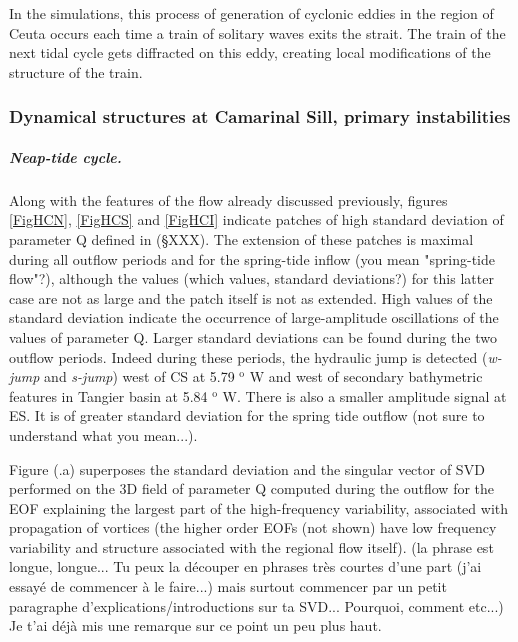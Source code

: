 In the simulations, this process of generation of cyclonic eddies \color{blue} in the region of Ceuta \color{black} occurs each time a train of solitary waves exits the strait. The train of the next tidal cycle gets diffracted on this eddy, creating local \color{blue}modifications of the structure of the train. \color{black}

\subsubsection{Dynamical structures at Camarinal Sill, primary instabilities}


\subparagraph{Neap-tide cycle.}
Along with the features of the flow already discussed previously, figures \ref{FigHCN}, \ref{FigHCS} and \ref{FigHCI} indicate patches of high standard deviation of parameter Q \color{blue} defined in (\S XXX). The extension of these patches is maximal during all outflow periods \color{black} and for the spring-tide inflow \color{green} (you mean "spring-tide flow"?), \color{black} although the values \color{green}(which values, standard deviations?) \color{black} for this latter case are not as large and the patch itself is not as extended. High values of the \color{blue} standard deviation \color{black} indicate the occurrence of large-amplitude oscillations of the values of parameter Q. \color{blue} Larger standard deviations can be found during the two outflow periods. Indeed during these periods, the hydraulic jump \color{black} is detected (\textit{w-jump} and \textit{s-jump}) west of CS at 5.79 $^\text{o}$ W and west of secondary bathymetric features in Tangier basin at 5.84 $^\text{o}$ W. There is also \color{blue} a smaller amplitude \color{black} signal at ES. It is of greater standard deviation for the spring tide outflow \color{green} (not sure to understand what you mean...). \color{black}

\color{blue}Figure (.a) superposes the standard deviation and \color{black} the singular vector of SVD performed on the 3D field of parameter Q computed during the outflow for the EOF explaining the largest part of the high-frequency variability, associated with propagation of vortices (the higher order EOFs (not shown) have low frequency variability and structure associated with the regional flow itself). \color{green}(la phrase est longue, longue... Tu peux la découper en phrases très courtes d'une part (j'ai essayé de commencer à le faire...) mais surtout commencer par un petit paragraphe d'explications/introductions sur ta SVD... Pourquoi, comment etc...) Je t'ai déjà mis une remarque sur ce point un peu plus haut. \color{black}


